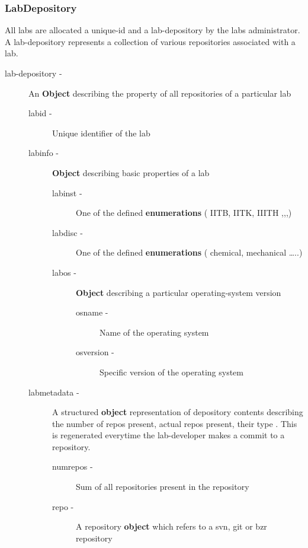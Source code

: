 \documentclass[11pt]{article}
\begin{document}
\subsubsection{LabDepository}
\label{sec-3.3.1}


     All labs are allocated a unique-id and a lab-depository by the
     labs administrator. A lab-depository represents a collection of
     various repositories associated with a lab.

\begin{description}
\item [lab-depository -] An \textbf{Object} describing the property of all
                    repositories of a particular lab

\begin{description}
\item [labid -] Unique identifier of the lab
\item [labinfo -] \textbf{Object} describing basic properties of a lab

\begin{description}
\item [labinst -] One of the defined \textbf{enumerations} ( IITB, IITK, IIITH ,,,)
\item [labdisc -] One of the defined \textbf{enumerations} ( chemical, mechanical \ldots{}..)
\item [labos -] \textbf{Object} describing a particular operating-system version

\begin{description}
\item [osname -] Name of the operating system
\item [osversion -] Specific version of the operating system
\end{description}

\end{description}

\item [labmetadata -] A structured \textbf{object} representation of depository
                     contents describing the number of repos present,
                     actual repos present, their type . This is regenerated
                     everytime the lab-developer makes a commit to a
                     repository.

\begin{description}
\item [numrepos -] Sum of all repositories present in the repository
\item [repo -] A repository \textbf{object} which refers to a svn, git or bzr repository


\end{description}
\end{description}
\end{description}
\end{document}
